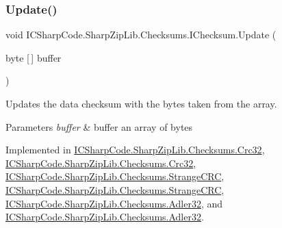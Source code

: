 \subsubsection{\texorpdfstring{Update()}{Update()}\hspace{0.1cm}{\footnotesize\ttfamily [3/6]}}
{\footnotesize\ttfamily void I\+C\+Sharp\+Code.\+Sharp\+Zip\+Lib.\+Checksums.\+I\+Checksum.\+Update (\begin{DoxyParamCaption}\item[{byte \mbox{[}$\,$\mbox{]}}]{buffer }\end{DoxyParamCaption})}



Updates the data checksum with the bytes taken from the array. 


\begin{DoxyParams}{Parameters}
{\em buffer} & buffer an array of bytes \\
\hline
\end{DoxyParams}


Implemented in \hyperlink{class_i_c_sharp_code_1_1_sharp_zip_lib_1_1_checksums_1_1_crc32_aed937de570263627f41641aea63e399f}{I\+C\+Sharp\+Code.\+Sharp\+Zip\+Lib.\+Checksums.\+Crc32}, \hyperlink{class_i_c_sharp_code_1_1_sharp_zip_lib_1_1_checksums_1_1_crc32_aed937de570263627f41641aea63e399f}{I\+C\+Sharp\+Code.\+Sharp\+Zip\+Lib.\+Checksums.\+Crc32}, \hyperlink{class_i_c_sharp_code_1_1_sharp_zip_lib_1_1_checksums_1_1_strange_c_r_c_aab01b02459d969f26576d15ac7cf3924}{I\+C\+Sharp\+Code.\+Sharp\+Zip\+Lib.\+Checksums.\+Strange\+C\+RC}, \hyperlink{class_i_c_sharp_code_1_1_sharp_zip_lib_1_1_checksums_1_1_strange_c_r_c_aab01b02459d969f26576d15ac7cf3924}{I\+C\+Sharp\+Code.\+Sharp\+Zip\+Lib.\+Checksums.\+Strange\+C\+RC}, \hyperlink{class_i_c_sharp_code_1_1_sharp_zip_lib_1_1_checksums_1_1_adler32_a37a55dd34c64e5b9ea40ef50a6e23afd}{I\+C\+Sharp\+Code.\+Sharp\+Zip\+Lib.\+Checksums.\+Adler32}, and \hyperlink{class_i_c_sharp_code_1_1_sharp_zip_lib_1_1_checksums_1_1_adler32_a37a55dd34c64e5b9ea40ef50a6e23afd}{I\+C\+Sharp\+Code.\+Sharp\+Zip\+Lib.\+Checksums.\+Adler32}.

\mbox{\label{interface_i_c_sharp_code_1_1_sharp_zip_lib_1_1_checksums_1_1_i_checksum_aee26d2b3705b22ab24cc9b5eb9dbc81d}} 

